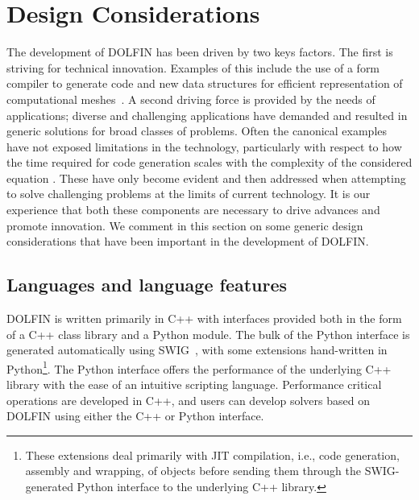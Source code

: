 \documentclass[acmtoms]{acmtrans2m}
\newcommand{\dolfin}{DOLFIN}
\begin{document}
\section{Design Considerations}
\label{sec:design}

The development of \dolfin{} has been driven by two keys
factors. The first is striving for technical innovation. Examples of
this include the use of a form compiler to generate code and new data
structures for efficient representation of computational
meshes~\cite{logg:2008}. A second driving force is provided by the
needs of applications; diverse and challenging applications have
demanded and resulted in generic solutions for broad classes of
problems. Often the canonical examples have not exposed limitations in
the technology, particularly with respect to how the time required
for code generation scales with the complexity of the considered
equation \cite{oelgaard:2009}.
These have only become evident and then addressed when
attempting to solve challenging problems at the limits of current
technology. It is our experience that both these components are
necessary to drive advances and promote innovation.
We comment in this section on some generic design considerations that have been
important in the development of \dolfin{}.
\subsection{Languages and language features}
\label{sec:languages}

\dolfin{} is written primarily in C++ with interfaces provided both in
the form of a C++ class library and a Python module. The bulk of the
Python interface is generated automatically using
SWIG~\cite{swig:www,beazley:2003}, with some extensions hand-written
in Python\footnote{These extensions deal primarily with JIT
  compilation, i.e., code generation, assembly and wrapping, of
  objects before sending them through the SWIG-generated Python
  interface to the underlying C++ library.}. The Python interface
offers the performance of the underlying C++ library with the ease of
an intuitive scripting language. Performance critical operations are
developed in C++, and users can develop solvers based on \dolfin{}
using either the C++ or Python interface.
\end{document}
